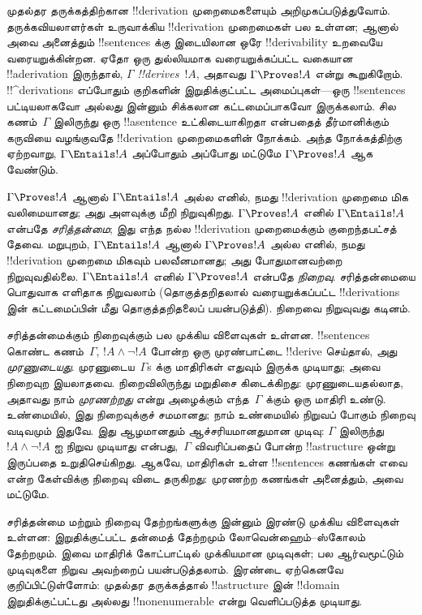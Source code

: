 \documentclass[../../../include/open-logic-section]{subfiles}
\begin{document}


முதல்தர தருக்கத்திற்கான !!{derivation} முறைமைகளையும் அறிமுகப்படுத்துவோம்.
தருக்கவியலாளர்கள் உருவாக்கிய !!{derivation} முறைமைகள் பல உள்ளன; ஆனால்
அவை அனைத்தும் !!{sentence}s க்கு இடையிலான ஒரே !!{derivability} உறவையே
வரையறுக்கின்றன. ஏதோ ஒரு துல்லியமாக வரையறுக்கப்பட்ட வகையான !!a{derivation}
இருந்தால், $\Gamma$ \emph{!!{derive}s}~$!A$, அதாவது $\Gamma \Proves !A$ என்று
கூறுகிறோம். !!^{derivation}s எப்போதும் குறிகளின் இறுதிக்குட்பட்ட
அமைப்புகள்---ஒரு !!{sentence}s பட்டியலாகவோ அல்லது இன்னும் சிக்கலான
கட்டமைப்பாகவோ இருக்கலாம். சில கணம்~$\Gamma$ இலிருந்து ஒரு !!a{sentence}
உட்கிடையாகிறதா என்பதைத் தீர்மானிக்கும் கருவியை வழங்குவதே !!{derivation}
முறைமைகளின் நோக்கம். அந்த நோக்கத்திற்கு ஏற்றவாறு, $\Gamma \Entails !A$
அப்போதும் அப்போது மட்டுமே $\Gamma \Proves !A$ ஆக வேண்டும்.

$\Gamma \Proves !A$ ஆனால் $\Gamma \Entails !A$ அல்ல எனில், நமது
!!{derivation} முறைமை மிக வலிமையானது; அது அளவுக்கு மீறி நிறுவுகிறது. $\Gamma
\Proves !A$ எனில் $\Gamma \Entails !A$ என்பதே \emph{சரித்தன்மை}; இது
எந்த நல்ல !!{derivation} முறைமைக்கும் குறைந்தபட்சத் தேவை. மறுபுறம்,
$\Gamma \Entails !A$ ஆனால் $\Gamma \Proves !A$ அல்ல எனில், நமது !!{derivation}
முறைமை மிகவும் பலவீனமானது; அது போதுமானவற்றை நிறுவுவதில்லை. $\Gamma
\Entails !A$ எனில் $\Gamma \Proves !A$ என்பதே \emph{நிறைவு}. சரித்தன்மையை
பொதுவாக எளிதாக நிறுவலாம் (தொகுத்தறிதலால் வரையறுக்கப்பட்ட !!{derivation}s இன்
கட்டமைப்பின் மீது தொகுத்தறிதலைப் பயன்படுத்தி). நிறைவை நிறுவுவது கடினம்.

சரித்தன்மைக்கும் நிறைவுக்கும் பல முக்கிய விளைவுகள் உள்ளன. !!{sentence}s
கொண்ட கணம்~$\Gamma$, $!A \land \lnot !A$ போன்ற ஒரு முரண்பாட்டை !!{derive}
செய்தால், அது \emph{முரணுடையது}. முரணுடைய~$\Gamma$s க்கு மாதிரிகள் எதுவும்
இருக்க முடியாது; அவை நிறைவுற இயலாதவை. நிறைவிலிருந்து மறுதிசை கிடைக்கிறது:
முரணுடையதல்லாத, அதாவது நாம் \emph{முரணற்றது} என்று அழைக்கும் எந்த~$\Gamma$
க்கும் ஒரு மாதிரி உண்டு. உண்மையில், இது நிறைவுக்குச் சமமானது; நாம் உண்மையில்
நிறுவப் போகும் நிறைவு வடிவமும் இதுவே. இது ஆழமானதும் ஆச்சரியமானதுமான முடிவு:
$\Gamma$ இலிருந்து $!A \land \lnot !A$ ஐ நிறுவ முடியாது என்பது,~$\Gamma$
விவரிப்பதைப் போன்ற !!a{structure} ஒன்று இருப்பதை உறுதிசெய்கிறது. ஆகவே,
மாதிரிகள் உள்ள !!{sentence}s கணங்கள் எவை என்ற கேள்விக்கு நிறைவு விடை தருகிறது:
முரணற்ற கணங்கள் அனைத்தும், அவை மட்டுமே.

சரித்தன்மை மற்றும் நிறைவு தேற்றங்களுக்கு இன்னும் இரண்டு முக்கிய விளைவுகள்
உள்ளன: இறுதிக்குட்பட்ட தன்மைத் தேற்றமும் லோவென்ஹைம்--ஸ்கோலம் தேற்றமும்.
இவை மாதிரிக் கோட்பாட்டில் முக்கியமான முடிவுகள்; பல ஆர்வமூட்டும் முடிவுகளை
நிறுவ அவற்றைப் பயன்படுத்தலாம். இரண்டை ஏற்கெனவே குறிப்பிட்டுள்ளோம்:
முதல்தர தருக்கத்தால் !!a{structure} இன் !!{domain} இறுதிக்குட்பட்டது அல்லது
!!{nonenumerable} என்று வெளிப்படுத்த முடியாது.
\end{document}
